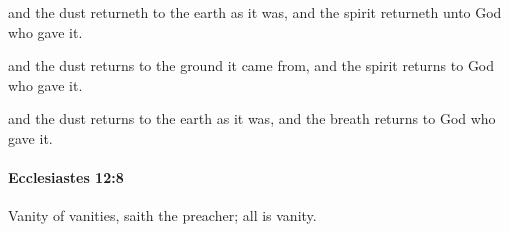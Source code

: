 			\begin{versebox}
					\item[BHS] 
					\item[LXX] 
					\item[ASV] and the dust returneth to the earth as it was, and the spirit returneth unto God who gave it.
					\item[NIV] and the dust returns to the ground it came from, and the spirit returns to God who gave it.
					\item[NRSV] and the dust returns to the earth as it was, and the breath returns to God who gave it.
			\end{versebox}

		\paragraph{Ecclesiastes 12:8} %
			\label{ECCLESIASTES-12-8}

			Vanity of vanities, saith the preacher; all is vanity.

